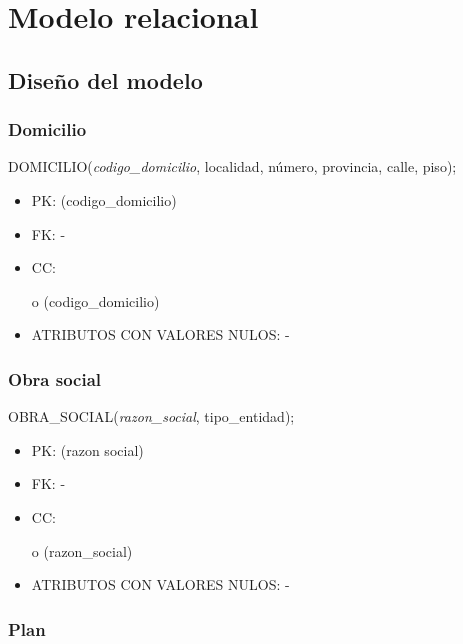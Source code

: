 \documentclass[a4paper,11pt]{article}
\begin{document}
\section{\textbf{Modelo relacional\label{HToc293405831}}}

\subsection{\textbf{Diseño del modelo\label{HToc293405832}}}

\subsubsection{\textbf{Domicilio}}

DOMICILIO(\emph{codigo\_domicilio}, localidad, número, provincia, calle, piso);
\begin{itemize}
\item PK: (codigo\_domicilio)

\item FK: -

\item CC:

o (codigo\_domicilio)

\item ATRIBUTOS CON VALORES NULOS: -\label{HToc293405833}
\end{itemize}

\subsubsection{\textbf{Obra social}}

OBRA\_SOCIAL(\emph{razon\_social}, tipo\_entidad);

\begin{itemize}
\item PK: (razon social)

\item FK: -

\item CC:

o (razon\_social)

\item ATRIBUTOS CON VALORES NULOS: -\label{HToc293405834}
\end{itemize}

\subsubsection{\textbf{Plan}}
\end{document}

